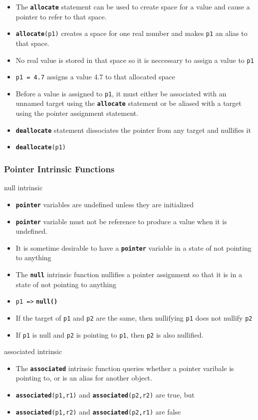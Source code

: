\documentclass[slidestop,mathserif,compress,xcolor=svgnames]{beamer}
\newcommand{\bftt}[1]{\textbf{\texttt{#1}}}
\begin{document}
\begin{frame}[allowframebreaks]
  \begin{itemize}
    \item The \bftt{allocate} statement can be used to create space for a value and cause a pointer to refer to that space.
    \item[] \bftt{allocate}\texttt{(p1)} creates a space for one real number and makes \texttt{p1} an alias to that space.
    \item No real value is stored in that space so it is neccessary to assign a value to \texttt{p1}
    \item \texttt{p1 = 4.7} assigns a value 4.7 to that allocated space
    \item Before a value is assigned to \texttt{p1}, it must either be associated with an unnamed target using the \bftt{allocate} statement or be aliased with a target using the pointer assignment statement.
    \item \bftt{deallocate} statement dissociates the pointer from any target and nullifies it
    \item[] \bftt{deallocate}\texttt{(p1)}
  \end{itemize}
\end{frame}

\begin{frame}
  \frametitle{\small Pointer Intrinsic Functions}
  \begin{block}{\scriptsize null intrinsic}
    \begin{itemize}
      \item \bftt{pointer} variables are undefined unless they are initialized
      \item \bftt{pointer} variable must not be reference to produce a value when it is undefined.
      \item It is sometime desirable to have a \bftt{pointer} variable in a state of not pointing to anything
      \item The \bftt{null} intrinsic function nullifies a pointer assignment so that it is in a state of not pointing to anything
      \item[] \texttt{p1 =>} \bftt{null()}
      \item If the target of \texttt{p1} and \texttt{p2} are the same, then nullifying \texttt{p1} does not nullify \texttt{p2}
      \item If \texttt{p1} is null and \texttt{p2} is pointing to \texttt{p1}, then \texttt{p2} is also nullified.
    \end{itemize}
  \end{block}
  \begin{block}{\scriptsize associated intrinsic}
    \begin{itemize}
      \item The \bftt{associated} intrinsic function queries whether a pointer varibale is pointing to, or is an alias for another object.
      \item[] \bftt{associated}\texttt{(p1,r1)} and \bftt{associated}\texttt{(p2,r2)} are true, but
      \item[] \bftt{associated}\texttt{(p1,r2)} and \bftt{associated}\texttt{(p2,r1)} are false
    \end{itemize}
  \end{block}
\end{frame}
\end{document}
